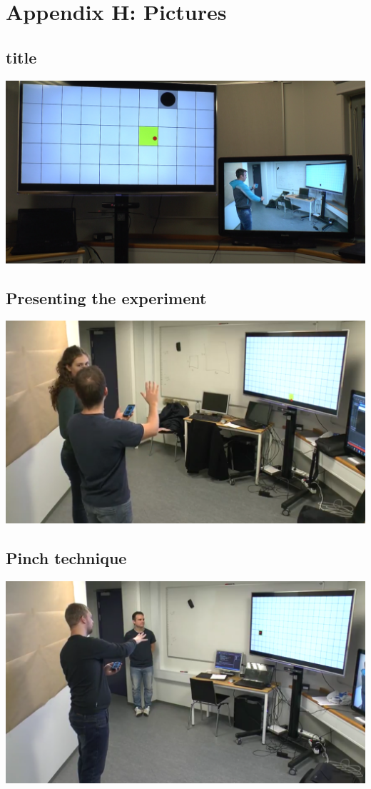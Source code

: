 \section*{Appendix H: Pictures}

\subsection*{title}
\includegraphics[width=\textwidth]{images/setup.jpg}

\subsection*{Presenting the experiment}
\includegraphics[width=\textwidth]{images/alina_presenting.png}

\subsection*{Pinch technique}
\includegraphics[width=\textwidth]{images/alex_pinching.png}

